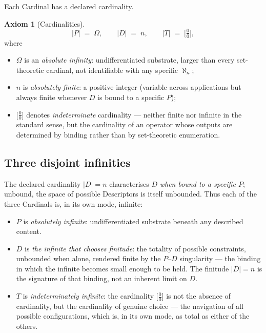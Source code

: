 \documentclass[11pt,a4paper]{article}
\theoremstyle{definition}
\newtheorem{axiom}[theorem]{Axiom}
\theoremstyle{remark}
\begin{document}
Each Cardinal has a declared cardinality.

\begin{axiom}[Cardinalities]\label{ax:cardinalities}
\[
|P| \;=\; \Omega, \qquad |D| \;=\; n, \qquad |T| \;=\; \bigl[\tfrac{0}{0}\bigr],
\]
where
\begin{itemize}[leftmargin=*]
\item $\Omega$ is an \emph{absolute infinity}: undifferentiated substrate, larger than every set-theoretic cardinal, not identifiable with any specific $\aleph_{\kappa}$;
\item $n$ is \emph{absolutely finite}: a positive integer (variable across applications but always finite whenever $D$ is bound to a specific $P$);
\item $\bigl[\tfrac{0}{0}\bigr]$ denotes \emph{indeterminate} cardinality --- neither finite nor infinite in the standard sense, but the cardinality of an operator whose outputs are determined by binding rather than by set-theoretic enumeration.
\end{itemize}
\end{axiom}

\subsection{Three disjoint infinities}\label{subsec:three-infinities}

The declared cardinality $|D|=n$ characterises $D$ \emph{when bound to a specific $P$}; unbound, the space of possible Descriptors is itself unbounded. Thus each of the three Cardinals is, in its own mode, infinite:
\begin{itemize}[leftmargin=*]
\item $P$ is \emph{absolutely infinite}: undifferentiated substrate beneath any described content.
\item $D$ is \emph{the infinite that chooses finitude}: the totality of possible constraints, unbounded when alone, rendered finite by the $P$--$D$ singularity --- the binding in which the infinite becomes small enough to be held. The finitude $|D|=n$ is the signature of that binding, not an inherent limit on $D$.
\item $T$ is \emph{indeterminately infinite}: the cardinality $\bigl[\tfrac{0}{0}\bigr]$ is not the absence of cardinality, but the cardinality of genuine choice --- the navigation of all possible configurations, which is, in its own mode, as total as either of the others.
\end{itemize}
\end{document}
